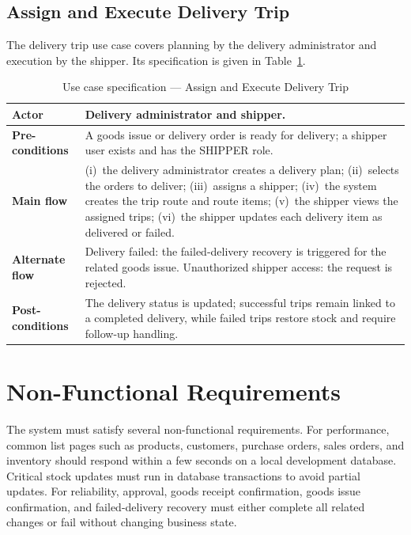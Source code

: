 \subsection{Assign and Execute Delivery Trip}
The delivery trip use case covers planning by the delivery administrator and
execution by the shipper. Its specification is given in Table~\ref{tab:uc-trip}.
\begin{table}[H]\centering
\caption{Use case specification --- Assign and Execute Delivery Trip}
\label{tab:uc-trip}
\begin{tabular}{|p{3cm}|p{11cm}|}
\hline
\textbf{Actor} & Delivery administrator and shipper. \\ \hline
\textbf{Pre-conditions} & A goods issue or delivery order is ready for delivery; a shipper user exists and has the SHIPPER role. \\ \hline
\textbf{Main flow} & (i)~the delivery administrator creates a delivery plan; (ii)~selects the orders to deliver; (iii)~assigns a shipper; (iv)~the system creates the trip route and route items; (v)~the shipper views the assigned trips; (vi)~the shipper updates each delivery item as delivered or failed. \\ \hline
\textbf{Alternate flow} & Delivery failed: the failed-delivery recovery is triggered for the related goods issue. Unauthorized shipper access: the request is rejected. \\ \hline
\textbf{Post-conditions} & The delivery status is updated; successful trips remain linked to a completed delivery, while failed trips restore stock and require follow-up handling. \\ \hline
\end{tabular}
\end{table}

\section{Non-Functional Requirements}
The system must satisfy several non-functional requirements. For performance,
common list pages such as products, customers, purchase orders, sales orders,
and inventory should respond within a few seconds on a local development
database. Critical stock updates must run in database transactions to avoid
partial updates. For reliability, approval, goods receipt confirmation, goods
issue confirmation, and failed-delivery recovery must either complete all
related changes or fail without changing business state.

